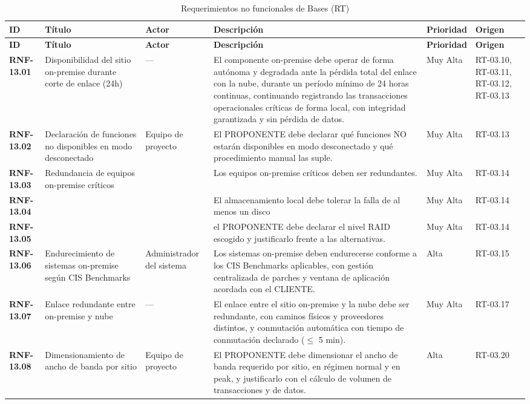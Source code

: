 ﻿\begin{longtable}{p{1.7cm} p{2.3cm} p{1.9cm} p{5.0cm} p{1.1cm} p{1.9cm}}
\caption{Requerimientos no funcionales de Bases (RT)}\label{tab:bt_rnf}\\
\toprule
\textbf{ID} & \textbf{T\'itulo} & \textbf{Actor} & \textbf{Descripci\'on} & \textbf{Prioridad} & \textbf{Origen} \\
\midrule
\endfirsthead
\toprule
\textbf{ID} & \textbf{T\'itulo} & \textbf{Actor} & \textbf{Descripci\'on} & \textbf{Prioridad} & \textbf{Origen} \\
\midrule
\endhead
\bottomrule
\endlastfoot
\textbf{RNF-13.01} & Disponibilidad del sitio on-premise durante corte de enlace (24h) & — & El componente on-premise debe operar de forma autónoma y degradada ante la pérdida total del enlace con la nube, durante un período mínimo de 24 horas continuas, continuando registrando las transacciones operacionales críticas de forma local, con integridad garantizada y sin pérdida de datos. & Muy Alta & RT-03.10, RT-03.11, RT-03.12, RT-03.13 \\
\textbf{RNF-13.02} & Declaración de funciones no disponibles en modo desconectado & Equipo de proyecto & El PROPONENTE debe declarar qué funciones NO estarán disponibles en modo desconectado y qué procedimiento manual las suple. & Muy Alta & RT-03.13 \\
\textbf{RNF-13.03} & Redundancia de equipos on-premise críticos &  & Los equipos on-premise críticos deben ser redundantes. & Muy Alta & RT-03.14 \\
\textbf{RNF-13.04} &  &  & El almacenamiento local debe tolerar la falla de al menos un disco & Muy Alta & RT-03.14 \\
\textbf{RNF-13.05} &  &  & el PROPONENTE debe declarar el nivel RAID escogido y justificarlo frente a las alternativas. & Muy Alta & RT-03.14 \\
\textbf{RNF-13.06} & Endurecimiento de sistemas on-premise según CIS Benchmarks & Administrador del sistema & Los sistemas on-premise deben endurecerse conforme a los CIS Benchmarks aplicables, con gestión centralizada de parches y ventana de aplicación acordada con el CLIENTE. & Alta & RT-03.15 \\
\textbf{RNF-13.07} & Enlace redundante entre on-premise y nube & — & El enlace entre el sitio on-premise y la nube debe ser redundante, con caminos físicos y proveedores distintos, y conmutación automática con tiempo de conmutación declarado ($\le$ 5 min). & Muy Alta & RT-03.17 \\
\textbf{RNF-13.08} & Dimensionamiento de ancho de banda por sitio & Equipo de proyecto & El PROPONENTE debe dimensionar el ancho de banda requerido por sitio, en régimen normal y en peak, y justificarlo con el cálculo de volumen de transacciones y de datos. & Alta & RT-03.20 \\

\end{longtable}
